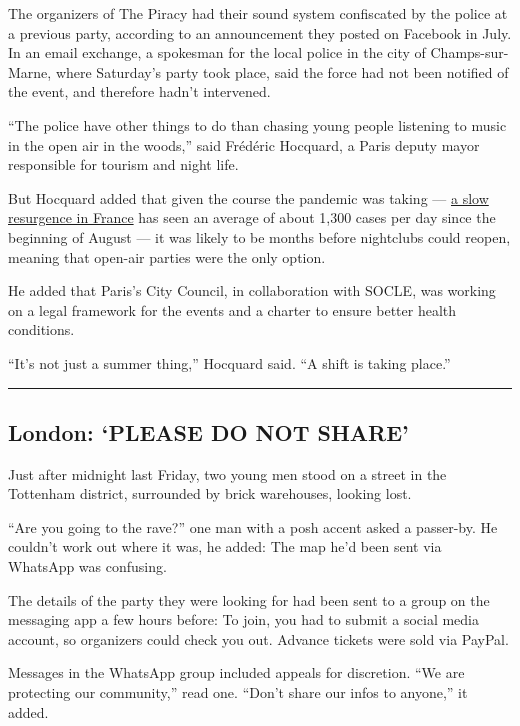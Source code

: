 The organizers of The Piracy had their sound system confiscated by the
police at a previous party, according to an announcement they posted on
Facebook in July. In an email exchange, a spokesman for the local police
in the city of Champs-sur-Marne, where Saturday's party took place, said
the force had not been notified of the event, and therefore hadn't
intervened.

``The police have other things to do than chasing young people listening
to music in the open air in the woods,'' said Frédéric Hocquard, a Paris
deputy mayor responsible for tourism and night life.

But Hocquard added that given the course the pandemic was taking ---
\href{https://www.nytimes3xbfgragh.onion/interactive/2020/world/europe/france-coronavirus-cases.html}{a
slow resurgence in France} has seen an average of about 1,300 cases per
day since the beginning of August --- it was likely to be months before
nightclubs could reopen, meaning that open-air parties were the only
option.

He added that Paris's City Council, in collaboration with SOCLE, was
working on a legal framework for the events and a charter to ensure
better health conditions.

``It's not just a summer thing,'' Hocquard said. ``A shift is taking
place.''

\begin{center}\rule{0.5\linewidth}{\linethickness}\end{center}

\hypertarget{london-please-do-not-share}{%
\subsection{London: `PLEASE DO NOT
SHARE'}\label{london-please-do-not-share}}

Just after midnight last Friday, two young men stood on a street in the
Tottenham district, surrounded by brick warehouses, looking lost.

``Are you going to the rave?'' one man with a posh accent asked a
passer-by. He couldn't work out where it was, he added: The map he'd
been sent via WhatsApp was confusing.

The details of the party they were looking for had been sent to a group
on the messaging app a few hours before: To join, you had to submit a
social media account, so organizers could check you out. Advance tickets
were sold via PayPal.

Messages in the WhatsApp group included appeals for discretion. ``We are
protecting our community,'' read one. ``Don't share our infos to
anyone,'' it added.

